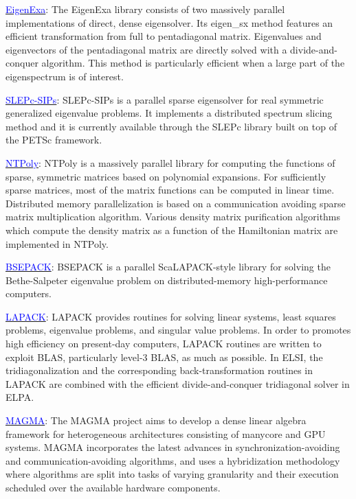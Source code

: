 \documentclass{report}
\newcommand{\tcb}[1]{\textcolor{blue}{#1}}
\begin{document}
\href{https://www.r-ccs.riken.jp/labs/lpnctrt/en/projects/eigenexa}{\tcb{EigenExa}}: The EigenExa library consists of two massively parallel implementations of direct, dense eigensolver. Its eigen\_sx method features an efficient transformation from full to pentadiagonal matrix. Eigenvalues and eigenvectors of the pentadiagonal matrix are directly solved with a divide-and-conquer algorithm. This method is particularly efficient when a large part of the eigenspectrum is of interest.

\href{http://slepc.upv.es}{\tcb{SLEPc-SIPs}}: SLEPc-SIPs is a parallel sparse eigensolver for real symmetric generalized eigenvalue problems. It implements a distributed spectrum slicing method and it is currently available through the SLEPc library built on top of the PETSc framework.

\href{https://william-dawson.github.io/NTPoly}{\tcb{NTPoly}}: NTPoly is a massively parallel library for computing the functions of sparse, symmetric matrices based on polynomial expansions. For sufficiently sparse matrices, most of the matrix functions can be computed in linear time. Distributed memory parallelization is based on a communication avoiding sparse matrix multiplication algorithm. Various density matrix purification algorithms which compute the density matrix as a function of the Hamiltonian matrix are implemented in NTPoly.

\href{https://sites.google.com/a/lbl.gov/bsepack}{\tcb{BSEPACK}}: BSEPACK is a parallel ScaLAPACK-style library for solving the Bethe-Salpeter eigenvalue problem on distributed-memory high-performance computers.

\href{https://www.netlib.org/lapack}{\tcb{LAPACK}}: LAPACK provides routines for solving linear systems, least squares problems, eigenvalue problems, and singular value problems. In order to promotes high efficiency on present-day computers, LAPACK routines are written to exploit BLAS, particularly level-3 BLAS, as much as possible. In ELSI, the tridiagonalization and the corresponding back-transformation routines in LAPACK are combined with the efficient divide-and-conquer tridiagonal solver in ELPA.

\href{https://icl.utk.edu/magma}{\tcb{MAGMA}}: The MAGMA project aims to develop a dense linear algebra framework for heterogeneous architectures consisting of manycore and GPU systems. MAGMA incorporates the latest advances in synchronization-avoiding and communication-avoiding algorithms, and uses a hybridization methodology where algorithms are split into tasks of varying granularity and their execution scheduled over the available hardware components.
\end{document}
